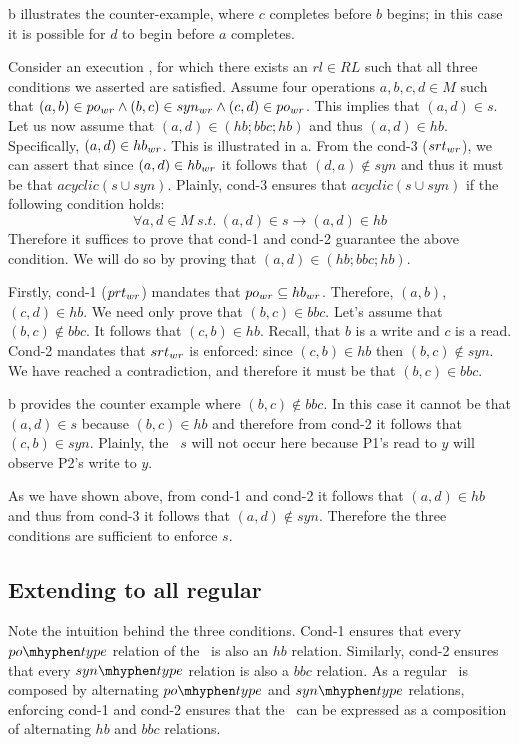 b illustrates the counter-example, where $c$ completes before $b$ begins; in this case it is possible for $d$ to begin before $a$ completes.





Consider an execution \Exec, for which there exists an $rl \in RL$ such that all three conditions we asserted are satisfied.
Assume four operations $a,b,c,d \in M$ such that $(a, b) \in po_{wr} \wedge (b,c) \in syn_{wr} \wedge (c,d) \in po_{wr}$. This implies that $(a, d) \in s$.
Let us now assume that 
$(a, d) \in  (hb;bbc;hb)$ and thus $(a,d) \in hb$. Specifically, $(a,d) \in hb_{wr}$. This is illustrated in a.
From the cond-3 ($srt_{wr}$), we can assert that since $(a,d) \in hb_{wr}$ it follows that $(d, a) \notin syn$ and thus it must be that $acyclic(s \cup syn)$.
Plainly, cond-3 ensures that  $acyclic(s \cup syn)$ if  the following condition holds: 
\begin{equation*}
 \forall a,d \in M\ s.t.\  (a, d) \in  s \rightarrow (a,d) \in hb
\end{equation*}
Therefore it suffices to prove that cond-1 and cond-2 guarantee the above condition. We will do so by proving that $(a, d) \in (hb;bbc;hb)$.

Firstly, cond-1 ($prt_{wr}$) mandates that $po_{wr} \subseteq hb_{wr}$.
Therefore, $(a, b)$, $(c, d) \in hb$. 
We need only prove that $(b, c) \in bbc$. 
Let's assume that $(b, c) \notin bbc$. It follows that $(c, b) \in hb$.
Recall, that $b$ is a write and $c$ is a read. Cond-2 mandates that $srt_{wr}$ is enforced: since $(c, b) \in hb$ then $(b, c) \notin syn$. 
We have reached a contradiction, and therefore it must be that $(b, c) \in bbc$.

b provides the counter example where $(b, c) \notin bbc$.
In this case it cannot be that $(a,d) \in s$ because $(b, c) \in hb$ and therefore from cond-2 it follows that $(c, b) \in syn$. Plainly, the \synpat\ $s$ will not occur here because P1's read to $y$ will observe P2's write to $y$.

As we have shown above, from cond-1 and cond-2 it follows that $(a, d) \in  hb$ and thus from cond-3 it follows that $(a, d) \notin syn$. Therefore the three conditions are sufficient to enforce $s$.

\subsection{Extending to all regular \synpats} \label{sec:rt-cons:reg-ex}
Note the intuition behind the three conditions. Cond-1 ensures that every $\potype$ relation of the \synpat\ is also an $hb$ relation. Similarly, cond-2 ensures that every $\syntype$ relation is also a $bbc$ relation. As a regular \synpat\ is composed by alternating $\potype$ and $\syntype$ relations, enforcing cond-1 and cond-2 ensures that the \synpat\ can be expressed as a composition of alternating $hb$ and $bbc$ relations.

